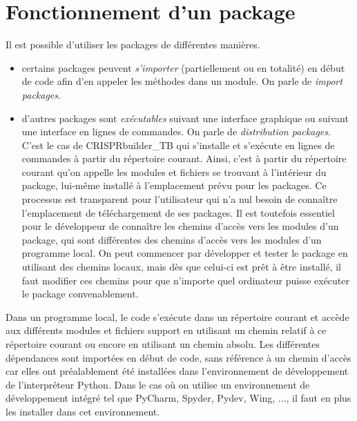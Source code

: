 \documentclass[twoside,a4paper,11pt,frenchb,openany]{report}
\begin{document}
\section{Fonctionnement d'un package}

Il est possible d'utiliser les packages de différentes manières. 
\begin{itemize}
\item certains packages peuvent \textit{s'importer} (partiellement ou en totalité) en début de code afin d'en appeler les méthodes dans un module. On parle de \textit{import packages}.
\item d'autres packages sont \textit{exécutables} suivant une interface graphique ou suivant une interface en lignes de commandes. On parle de \textit{distribution packages}. C'est le cas de CRISPRbuilder\_TB qui s'installe et s'exécute en lignes de commandes à partir du répertoire courant. Ainsi, c'est à partir du répertoire courant qu'on appelle les modules et fichiers se trouvant à l'intérieur du package, lui-même installé à l'emplacement prévu pour les packages. Ce processus est transparent pour l'utilisateur qui n'a nul besoin de connaître l'emplacement de téléchargement de ses packages. Il est toutefois essentiel pour le développeur de connaître les chemins d'accès vers les modules d'un package, qui sont différentes des chemins d'accès vers les modules d'un programme local. On peut commencer par développer et tester le package en utilisant des chemins locaux, mais dès que celui-ci est prêt à être installé, il faut modifier ces chemins pour que n'importe quel ordinateur puisse exécuter le package convenablement.
\end{itemize}

Dans un programme local, le code s'exécute dans un répertoire courant et accède aux différents modules et fichiers support en utilisant un chemin relatif à ce répertoire courant ou encore en utilisant un chemin absolu. Les différentes dépendances sont importées en début de code, sans référence à un chemin d'accès car elles ont préalablement été installées dans l'environnement de développement de l'interpréteur Python. Dans le cas où on utilise un environnement de développement intégré tel que PyCharm, Spyder, Pydev, Wing, ..., il faut en plus les installer dans cet environnement.
\end{document}
